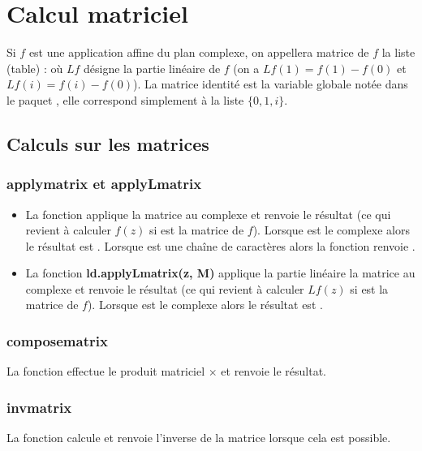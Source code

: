 \section{Calcul matriciel}

Si $f$ est une application affine du plan complexe, on appellera matrice de $f$ la liste (table) :
où $Lf$ désigne la partie linéaire de $f$ (on a $Lf(1) = f(1)-f(0)$ et $Lf(i)=f(i)-f(0)$). La matrice identité est la variable globale notée  dans le paquet \luadrawenv, elle correspond simplement à la liste $\{0,1,i\}$.

\subsection{Calculs sur les matrices}

\subsubsection{applymatrix et applyLmatrix}
\begin{itemize}
    \item La fonction  applique la matrice  au complexe  et renvoie le résultat (ce qui revient à calculer $f(z)$ si  est la matrice de $f$). Lorsque  est le complexe  alors le résultat est . Lorsque  est une chaîne de caractères alors la fonction renvoie .
    
    \item La fonction \textbf{ld.applyLmatrix(z, M)} applique la partie linéaire la matrice  au complexe  et renvoie le résultat (ce qui revient à calculer $Lf(z)$ si  est la matrice de $f$). Lorsque  est le complexe  alors le résultat est .
\end{itemize}

\subsubsection{composematrix}
La fonction  effectue le produit matriciel $\times$ et renvoie le résultat.

\subsubsection{invmatrix}
La fonction  calcule et renvoie l'inverse de la matrice  lorsque cela est possible.

